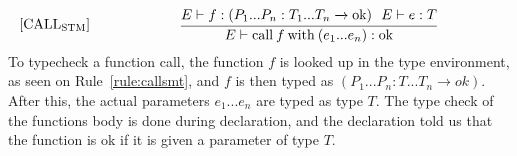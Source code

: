 \begin{equation}\label{rule:callsmt}
\begin{minipage}{.2\linewidth}
$[\text{CALL}_\text{STM}]$
\end{minipage}
\begin{minipage}{.8\linewidth}
\centering
$\cfrac{E \vdash f : (P_1...P_n : T_1...T_n \xrightarrow{}\text{ok}) \: \: \: E \vdash e : T}{E \vdash \text{call} \: f \: \text{with} \: (e_1...e_n) : \text{ok}}$
\end{minipage}
\end{equation}
To typecheck a function call, the function $f$ is looked up in the type environment, as seen on Rule~\ref{rule:callsmt}, and $f$ is then typed as $(P_1...P_n : T...T_n \xrightarrow{} ok)$. After this, the actual parameters $e_1...e_n$ are typed as type $T$. The type check of the functions body is done during declaration, and the declaration told us that the function is ok if it is given a parameter of type $T$.